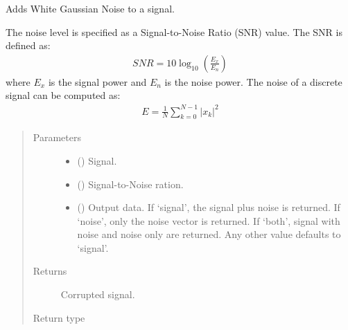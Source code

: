 \documentclass[letterpaper,10pt,english]{sphinxmanual}
\begin{document}
\begin{fulllineitems}
\label{\detokenize{pynoise:pynoise.noise.awgn}}
Adds White Gaussian Noise to a signal.

The noise level is specified as a Signal-to-Noise Ratio (SNR) value.
The SNR is defined as:
\begin{equation*}
\begin{split}SNR = 10\log_{10}\left(\frac{E_x}{E_n}\right)\end{split}
\end{equation*}
where \(E_x\) is the signal power and \(E_n\) is the noise
power. The noise of a discrete signal can be computed as:
\begin{equation*}
\begin{split}E = \frac{1}{N}\sum_{k=0}^{N - 1}|x_k|^2\end{split}
\end{equation*}\begin{quote}\begin{description}
\item[{Parameters}] \leavevmode\begin{itemize}
\item {} 
 () \textendash{} Signal.

\item {} 
 (\sphinxstyleliteralemphasis{\sphinxupquote{, }}) \textendash{} Signal-to-Noise ration.

\item {} 
 (\sphinxstyleliteralemphasis{\sphinxupquote{, }}) \textendash{} Output data. If ‘signal’, the signal  plus noise is
returned. If ‘noise’, only the noise vector is returned. If
‘both’, signal with noise and noise only are returned. Any
other value defaults to ‘signal’.

\end{itemize}

\item[{Returns}] \leavevmode
Corrupted signal.

\item[{Return type}] \leavevmode
{}

\end{description}\end{quote}

\end{fulllineitems}
\end{document}
